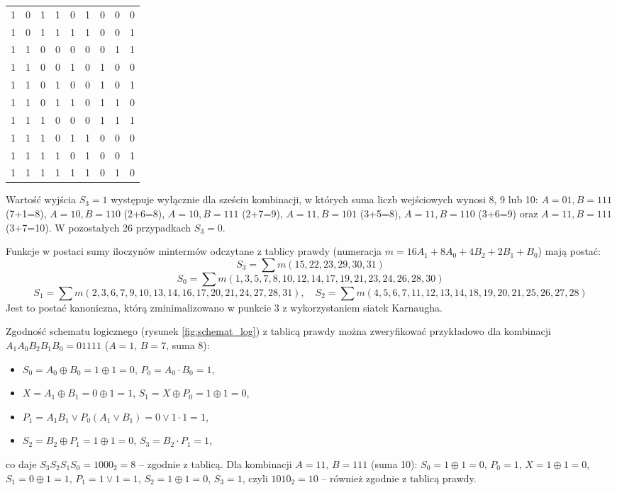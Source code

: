 \documentclass[11pt]{article}
\begin{document}
\begin{table}[H]
\begin{tabular}{ccccc|cccc}
1 & 0 & 1 & 1 & 0 & 1 & 0 & 0 & 0 \\
1 & 0 & 1 & 1 & 1 & 1 & 0 & 0 & 1 \\
1 & 1 & 0 & 0 & 0 & 0 & 0 & 1 & 1 \\
1 & 1 & 0 & 0 & 1 & 0 & 1 & 0 & 0 \\
1 & 1 & 0 & 1 & 0 & 0 & 1 & 0 & 1 \\
1 & 1 & 0 & 1 & 1 & 0 & 1 & 1 & 0 \\
1 & 1 & 1 & 0 & 0 & 0 & 1 & 1 & 1 \\
1 & 1 & 1 & 0 & 1 & 1 & 0 & 0 & 0 \\
1 & 1 & 1 & 1 & 0 & 1 & 0 & 0 & 1 \\
1 & 1 & 1 & 1 & 1 & 1 & 0 & 1 & 0 \\
\hline
\end{tabular}
\end{table}

Wartość wyjścia \(S_3 = 1\) występuje wyłącznie dla sześciu kombinacji, w których suma liczb wejściowych wynosi 8, 9 lub 10: \(A=01, B=111\) (7+1=8), \(A=10, B=110\) (2+6=8), \(A=10, B=111\) (2+7=9), \(A=11, B=101\) (3+5=8), \(A=11, B=110\) (3+6=9) oraz \(A=11, B=111\) (3+7=10). W pozostałych 26 przypadkach \(S_3 = 0\).

Funkcje w postaci sumy iloczynów mintermów odczytane z tablicy prawdy (numeracja \(m = 16A_1 + 8A_0 + 4B_2 + 2B_1 + B_0\)) mają postać:
\begin{equation}
S_3 = \sum m(15,22,23,29,30,31)
\end{equation}
\begin{equation}
S_0 = \sum m(1,3,5,7,8,10,12,14,17,19,21,23,24,26,28,30)
\end{equation}
\begin{equation}
S_1 = \sum m(2,3,6,7,9,10,13,14,16,17,20,21,24,27,28,31), \quad
S_2 = \sum m(4,5,6,7,11,12,13,14,18,19,20,21,25,26,27,28)
\end{equation}
Jest to postać kanoniczna, którą zminimalizowano w punkcie 3 z wykorzystaniem siatek Karnaugha.

Zgodność schematu logicznego (rysunek \ref{fig:schemat_log}) z tablicą prawdy można zweryfikować przykładowo dla kombinacji \(A_1A_0B_2B_1B_0 = 01111\) (\(A=1\), \(B=7\), suma 8):
\begin{itemize}
    \item \(S_0 = A_0 \oplus B_0 = 1 \oplus 1 = 0\), \(P_0 = A_0 \cdot B_0 = 1\),
    \item \(X = A_1 \oplus B_1 = 0 \oplus 1 = 1\), \(S_1 = X \oplus P_0 = 1 \oplus 1 = 0\),
    \item \(P_1 = A_1B_1 \lor P_0(A_1 \lor B_1) = 0 \lor 1\cdot 1 = 1\),
    \item \(S_2 = B_2 \oplus P_1 = 1 \oplus 1 = 0\), \(S_3 = B_2 \cdot P_1 = 1\),
\end{itemize}
co daje \(S_3S_2S_1S_0 = 1000_2 = 8\) -- zgodnie z tablicą. Dla kombinacji \(A=11\), \(B=111\) (suma 10): \(S_0 = 1 \oplus 1 = 0\), \(P_0 = 1\), \(X = 1 \oplus 1 = 0\), \(S_1 = 0 \oplus 1 = 1\), \(P_1 = 1 \lor 1 = 1\), \(S_2 = 1 \oplus 1 = 0\), \(S_3 = 1\), czyli \(1010_2 = 10\) -- również zgodnie z tablicą prawdy.
\end{document}
